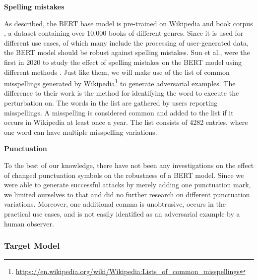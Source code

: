 \textbf{Spelling mistakes}

As described, the BERT base model is pre-trained on Wikipedia and book corpus \cite{zhu2015aligning}, a dataset containing over 10,000 books of different genres. Since it is used for different use cases, of which many include the processing of user-generated data, the BERT model should be robust against spelling mistakes. Sun et al., were the first in 2020 to study the effect of spelling mistakes on the BERT model using different methods \cite{sun2020adv}. Just like them, we will make use of the list of common misspellings generated by Wikipedia\footnote{\url{https://en.wikipedia.org/wiki/Wikipedia:Lists_of_common_misspellings}} to generate adversarial examples. The difference to their work is the method for identifying the word to execute the perturbation on. 
The words in the list are gathered by users reporting misspellings. A misspelling is considered common and added to the list if it occurs in Wikipedia at least once a year.
The list consists of 4282 entries, where one word can have multiple misspelling variations. 


\textbf{Punctuation}

To the best of our knowledge, there have not been any investigations on the effect of changed punctuation symbols on the robustness of a BERT model. Since we were able to generate successful attacks by merely adding one punctuation mark, we limited ourselves to that and did no further research on different punctuation variations. Moreover, one additional comma is unobtrusive, occurs in the practical use cases, and is not easily identified as an adversarial example by a human observer.


\subsubsection{Target Model} 
\label{sec:target_model_method}

